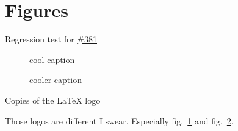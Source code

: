 \section{Figures}\label{figures}

Regression test for
\href{https://github.com/lierdakil/pandoc-crossref/issues/381}{\#381}

\begin{pandoccrossrefsubfigures}

\begin{subfigure}{0.4\linewidth}\caption{cool
caption\label{fig:logo1}}\end{subfigure}%
\begin{subfigure}{0.4\linewidth}\caption{cooler
caption\label{fig:logo2}}\end{subfigure}%

\caption{Copies of the LaTeX logo}\label{fig:latex}

\end{pandoccrossrefsubfigures}

Those logos are different I swear. Especially fig.~\ref{fig:logo1} and
fig.~\ref{fig:logo2}.
